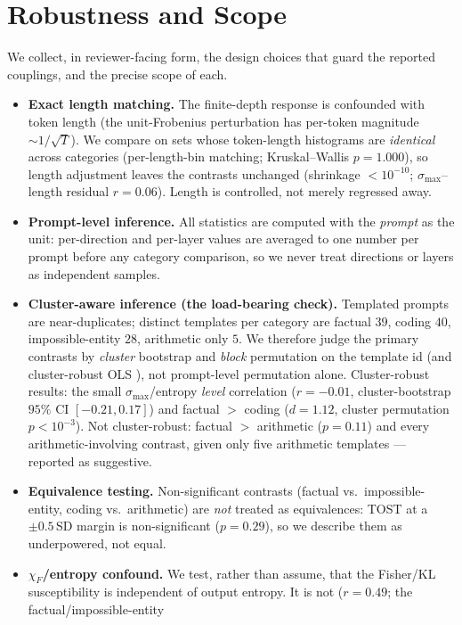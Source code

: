 \documentclass{article}
\begin{document}
\section{Robustness and Scope}
\label{sec:robustness}
We collect, in reviewer-facing form, the design choices that guard the reported couplings, and the
precise scope of each.
\begin{itemize}\setlength{\itemsep}{3pt}
  \item \textbf{Exact length matching.} The finite-depth response is confounded with token length
  (the unit-Frobenius perturbation has per-token magnitude $\sim\!1/\sqrt T$). We compare on sets
  whose token-length histograms are \emph{identical} across categories (per-length-bin matching;
  Kruskal--Wallis $p=1.000$), so length adjustment leaves the contrasts unchanged (shrinkage
  $<10^{-10}$; $\sigma_{\max}$--length residual $r=0.06$). Length is controlled, not merely
  regressed away.
  \item \textbf{Prompt-level inference.} All statistics are computed with the \emph{prompt} as the
  unit: per-direction and per-layer values are averaged to one number per prompt before any category
  comparison, so we never treat directions or layers as independent samples.
  \item \textbf{Cluster-aware inference (the load-bearing check).} Templated prompts are
  near-duplicates; distinct templates per category are factual $39$, coding $40$, impossible-entity
  $28$, arithmetic only $5$. We therefore judge the primary contrasts by \emph{cluster} bootstrap and
  \emph{block} permutation on the template id (and cluster-robust OLS \cite{cameron2015practitioner}),
  not prompt-level permutation alone. Cluster-robust results: the small $\sigma_{\max}$/entropy
  \emph{level} correlation ($r=-0.01$, cluster-bootstrap $95\%$ CI $[-0.21,0.17]$) and factual $>$
  coding ($d=1.12$, cluster permutation $p<10^{-3}$). Not cluster-robust: factual $>$ arithmetic
  ($p=0.11$) and every arithmetic-involving contrast, given only five arithmetic templates --- reported
  as suggestive.
  \item \textbf{Equivalence testing.} Non-significant contrasts (factual vs.\ impossible-entity,
  coding vs.\ arithmetic) are \emph{not} treated as equivalences: TOST at a $\pm0.5$\,SD margin is
  non-significant ($p=0.29$), so we describe them as underpowered, not equal.
  \item \textbf{$\chi_F$/entropy confound.} We test, rather than assume, that the Fisher/KL
  susceptibility is independent of output entropy. It is not ($r=0.49$; the factual/impossible-entity

\end{itemize}
\end{document}
